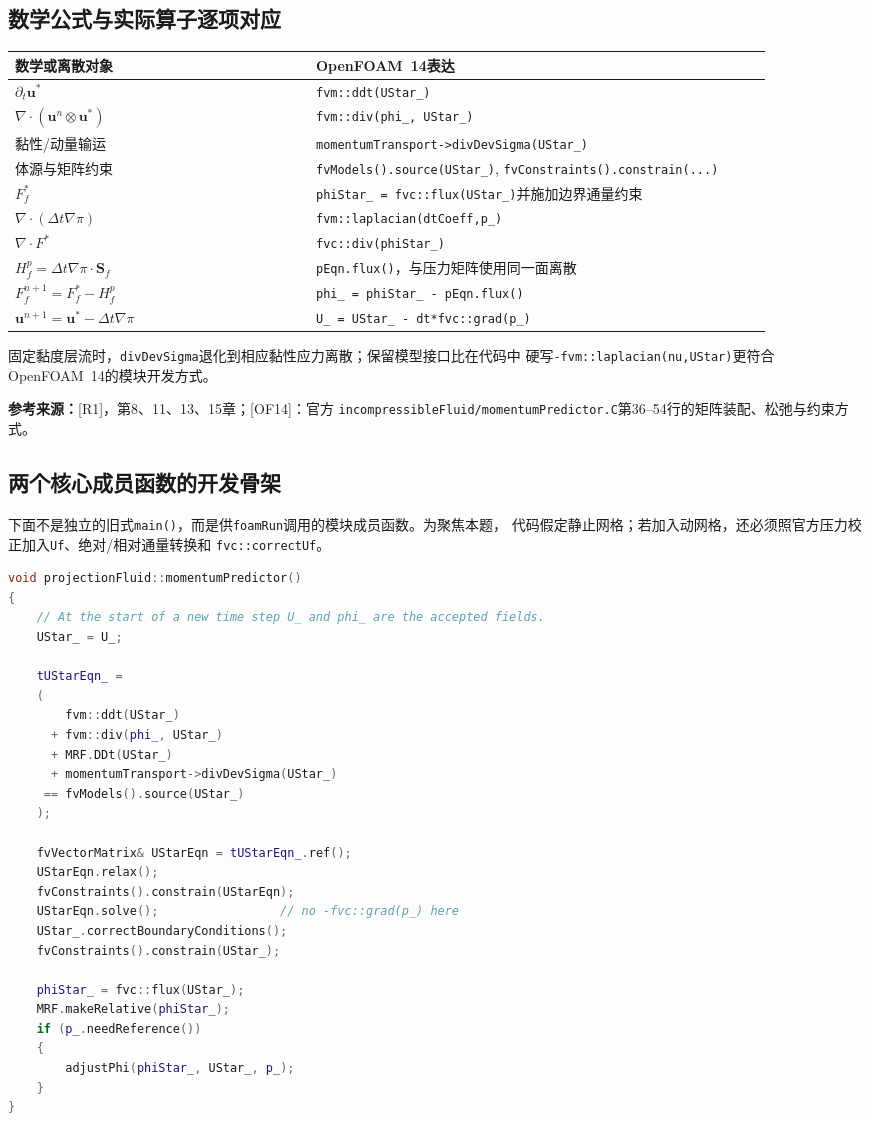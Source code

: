 \documentclass[UTF8,12pt,a4paper]{ctexart}
\numberwithin{equation}{section}
\newcommand{\dt}{\Delta t}
\newcommand{\Rone}{\textnormal{[R1]}}
\newcommand{\OFfourteen}{\textnormal{[OF14]}}
\newcommand{\source}[1]{\par\smallskip\noindent\colorbox{sourcebg}{%
  \parbox{0.955\linewidth}{\footnotesize\color{sourcegray}\textbf{参考来源：}#1}}\par\smallskip}
\begin{document}
\subsection{数学公式与实际算子逐项对应}
\begin{longtable}{p{0.35\linewidth}p{0.53\linewidth}}
\toprule
数学或离散对象 & OpenFOAM~14表达\\
\midrule
$\partial_t\bm u^*$ & \texttt{fvm::ddt(UStar\_)}\\
$\nabla\cdot(\bm u^n\otimes\bm u^*)$ & \texttt{fvm::div(phi\_, UStar\_)}\\
黏性/动量输运 & \texttt{momentumTransport->divDevSigma(UStar\_)}\\
体源与矩阵约束 & \texttt{fvModels().source(UStar\_)}, \texttt{fvConstraints().constrain(...)}\\
$F_f^*$ & \texttt{phiStar\_ = fvc::flux(UStar\_)}并施加边界通量约束\\
$\nabla\cdot(\dt\nabla\pi)$ & \texttt{fvm::laplacian(dtCoeff,p\_)}\\
$\nabla\cdot F^*$ & \texttt{fvc::div(phiStar\_)}\\
$H_f^p=\dt\nabla\pi\cdot\bm S_f$ & \texttt{pEqn.flux()}，与压力矩阵使用同一面离散\\
$F_f^{n+1}=F_f^*-H_f^p$ & \texttt{phi\_ = phiStar\_ - pEqn.flux()}\\
$\bm u^{n+1}=\bm u^*-\dt\nabla\pi$ & \texttt{U\_ = UStar\_ - dt*fvc::grad(p\_)}\\
\bottomrule
\end{longtable}
固定黏度层流时，\texttt{divDevSigma}退化到相应黏性应力离散；保留模型接口比在代码中
硬写\texttt{-fvm::laplacian(nu,UStar)}更符合OpenFOAM~14的模块开发方式。
\source{\Rone，第8、11、13、15章；\OFfourteen：官方
\texttt{incompressibleFluid/momentumPredictor.C}第36--54行的矩阵装配、松弛与约束方式。}

\subsection{两个核心成员函数的开发骨架}
下面不是独立的旧式\texttt{main()}，而是供\texttt{foamRun}调用的模块成员函数。为聚焦本题，
代码假定静止网格；若加入动网格，还必须照官方压力校正加入\texttt{Uf}、绝对/相对通量转换和
\texttt{fvc::correctUf}。

\begin{lstlisting}[style=foam,language=C++]
void projectionFluid::momentumPredictor()
{
    // At the start of a new time step U_ and phi_ are the accepted fields.
    UStar_ = U_;

    tUStarEqn_ =
    (
        fvm::ddt(UStar_)
      + fvm::div(phi_, UStar_)
      + MRF.DDt(UStar_)
      + momentumTransport->divDevSigma(UStar_)
     == fvModels().source(UStar_)
    );

    fvVectorMatrix& UStarEqn = tUStarEqn_.ref();
    UStarEqn.relax();
    fvConstraints().constrain(UStarEqn);
    UStarEqn.solve();                 // no -fvc::grad(p_) here
    UStar_.correctBoundaryConditions();
    fvConstraints().constrain(UStar_);

    phiStar_ = fvc::flux(UStar_);
    MRF.makeRelative(phiStar_);
    if (p_.needReference())
    {
        adjustPhi(phiStar_, UStar_, p_);
    }
}
\end{lstlisting}
\end{document}

